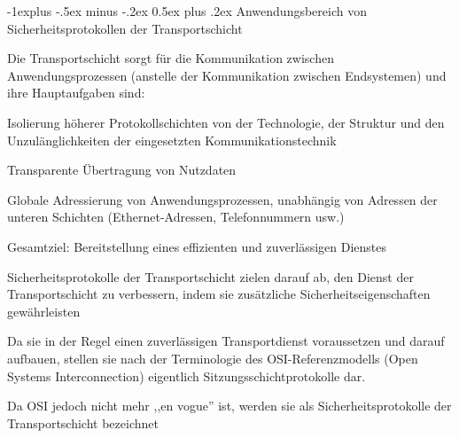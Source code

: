 \documentclass[a4paper]{article}
\makeatletter
\renewcommand{\subsection}{\@startsection{subsection}{2}{0mm}%
 {-1explus -.5ex minus -.2ex}%
 {0.5ex plus .2ex}%
 {\normalfont\normalsize\bfseries}}
\makeatother
\begin{document}
\begin{multicols}{3}
      \subsection{Anwendungsbereich von Sicherheitsprotokollen der Transportschicht}
      \begin{itemize*}
            \item Die Transportschicht sorgt für die Kommunikation zwischen Anwendungsprozessen (anstelle der Kommunikation zwischen Endsystemen) und ihre Hauptaufgaben sind:
            \begin{itemize*}
                  \item Isolierung höherer Protokollschichten von der Technologie, der Struktur und den Unzulänglichkeiten der eingesetzten Kommunikationstechnik
                  \item Transparente Übertragung von Nutzdaten
                  \item Globale Adressierung von Anwendungsprozessen, unabhängig von Adressen der unteren Schichten (Ethernet-Adressen, Telefonnummern usw.)
                  \item Gesamtziel: Bereitstellung eines effizienten und zuverlässigen Dienstes
            \end{itemize*}
            \item Sicherheitsprotokolle der Transportschicht zielen darauf ab, den
            Dienst der Transportschicht zu verbessern, indem sie zusätzliche
            Sicherheitseigenschaften gewährleisten
            \begin{itemize*}
                  \item Da sie in der Regel einen zuverlässigen Transportdienst voraussetzen und darauf aufbauen, stellen sie nach der Terminologie des OSI-Referenzmodells (Open Systems Interconnection) eigentlich Sitzungsschichtprotokolle dar.
                  \item Da OSI jedoch nicht mehr ,,en vogue'' ist, werden sie als Sicherheitsprotokolle der Transportschicht bezeichnet
            \end{itemize*}
      \end{itemize*}


\end{multicols}
\end{document}
